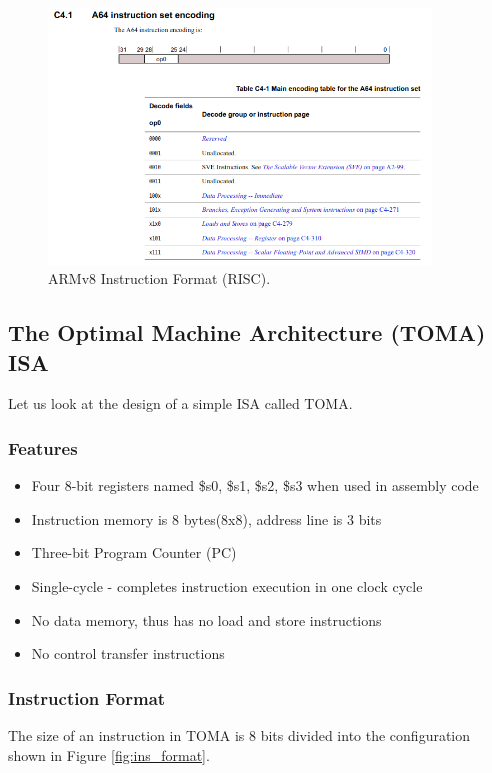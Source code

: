 \documentclass[a4paper, 11pt,oneside]{article}
\begin{document}
\begin{figure}[H]
	\begin{center}
	\includegraphics[width=4in]{armv8.png}
	\caption{ARMv8 Instruction Format (RISC).}
	\label{fig:armv8} 
	\end{center}
\end{figure}

\subsection{The Optimal Machine Architecture (TOMA) ISA}
Let us look at the design of a simple ISA called TOMA.

\subsubsection{Features}
\begin{itemize}
\item Four 8-bit registers named \$s0, \$s1, \$s2, \$s3 when used in assembly 
code
\item Instruction memory is 8 bytes(8x8), address line is 3 bits
\item Three-bit Program Counter (PC)
\item Single-cycle - completes instruction execution in one clock cycle
\item No data memory, thus has no load and store instructions
\item No control transfer instructions
\end{itemize}

\subsubsection{Instruction Format}
The size of an instruction in TOMA is 8 bits divided into the configuration 
shown in Figure \ref{fig:ins_format}.
\end{document}
